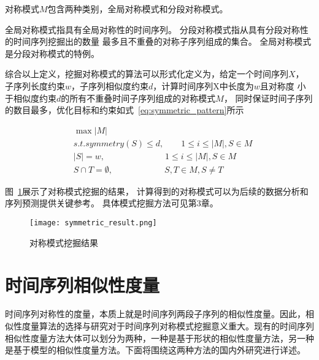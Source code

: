 \begin{definition}
  对称模式$M$包含两种类别，全局对称模式和分段对称模式。

  全局对称模式指具有全局对称性的时间序列。
  分段对称模式指从具有分段对称性的时间序列挖掘出的数量
  最多且不重叠的对称子序列组成的集合。
  全局对称模式是分段对称模式的特例。 
  
\end{definition}

综合以上定义，挖掘对称模式的算法可以形式化定义为，给定一个时间序列$X$，
子序列长度约束$w$，子序列相似度约束$d$，计算时间序列X中长度为$w$且对称度
小于相似度约束$d$的所有不重叠时间子序列组成的对称模式$M$，
同时保证时间子序列的数目最多，优化目标和约束如式~\ref{eq:symmetric_pattern}所示

\begin{equation}
  \begin{split}
    & \max \left| M \right| \\
    & s.t. symmetry \left( S \right) \leq d, \qquad 1 \leq i \leq \left| M \right|,S \in M \\
    & \left| S \right| = w, \qquad \qquad \qquad \quad 1 \leq i \leq \left| M \right|,S \in M \\
    & S \cap T = \emptyset, \qquad \qquad \qquad S,T \in M,S \neq T
  \end{split}
  \label{eq:symmetric_pattern}
\end{equation}

图~\ref{fig:symmetric_result}展示了对称模式挖掘的结果，
计算得到的对称模式可以为后续的数据分析和序列预测提供关键参考。
具体模式挖掘方法可见第3章。
\begin{figure}
  \centering
  \texttt{[image: symmetric\_result.png]}
  \caption{对称模式挖掘结果}
  \label{fig:symmetric_result}
\end{figure}

\section{时间序列相似性度量}
时间序列对称性的度量，本质上就是时间序列两段子序列的相似性度量。因此，相似性度量算法的选择与研究对于时间序列对称模式挖掘意义重大。现有的时间序列相似性度量方法大体可以划分为两种，一种是基于形状的相似性度量方法，另一种是基于模型的相似性度量方法。下面将围绕这两种方法的国内外研究进行详述。

